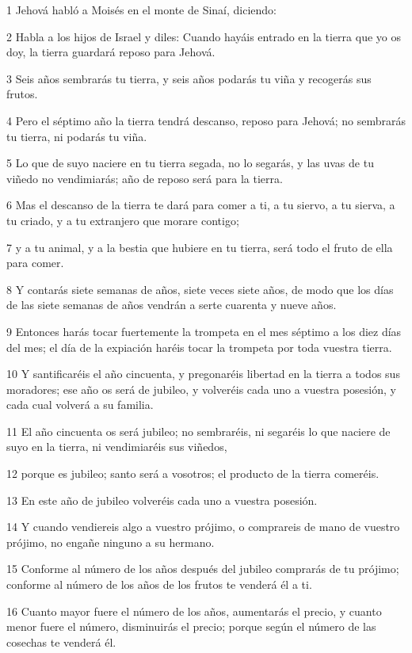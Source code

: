 \par 1 Jehová habló a Moisés en el monte de Sinaí, diciendo:
\par 2 Habla a los hijos de Israel y diles: Cuando hayáis entrado en la tierra que yo os doy, la tierra guardará reposo para Jehová.
\par 3 Seis años sembrarás tu tierra, y seis años podarás tu viña y recogerás sus frutos.
\par 4 Pero el séptimo año la tierra tendrá descanso, reposo para Jehová; no sembrarás tu tierra, ni podarás tu viña.
\par 5 Lo que de suyo naciere en tu tierra segada, no lo segarás, y las uvas de tu viñedo no vendimiarás; año de reposo será para la tierra.
\par 6 Mas el descanso de la tierra te dará para comer a ti, a tu siervo, a tu sierva, a tu criado, y a tu extranjero que morare contigo;
\par 7 y a tu animal, y a la bestia que hubiere en tu tierra, será todo el fruto de ella para comer.
\par 8 Y contarás siete semanas de años, siete veces siete años, de modo que los días de las siete semanas de años vendrán a serte cuarenta y nueve años.
\par 9 Entonces harás tocar fuertemente la trompeta en el mes séptimo a los diez días del mes; el día de la expiación haréis tocar la trompeta por toda vuestra tierra.
\par 10 Y santificaréis el año cincuenta, y pregonaréis libertad en la tierra a todos sus moradores; ese año os será de jubileo, y volveréis cada uno a vuestra posesión, y cada cual volverá a su familia.
\par 11 El año cincuenta os será jubileo; no sembraréis, ni segaréis lo que naciere de suyo en la tierra, ni vendimiaréis sus viñedos,
\par 12 porque es jubileo; santo será a vosotros; el producto de la tierra comeréis.
\par 13 En este año de jubileo volveréis cada uno a vuestra posesión.
\par 14 Y cuando vendiereis algo a vuestro prójimo, o comprareis de mano de vuestro prójimo, no engañe ninguno a su hermano.
\par 15 Conforme al número de los años después del jubileo comprarás de tu prójimo; conforme al número de los años de los frutos te venderá él a ti.
\par 16 Cuanto mayor fuere el número de los años, aumentarás el precio, y cuanto menor fuere el número, disminuirás el precio; porque según el número de las cosechas te venderá él.
